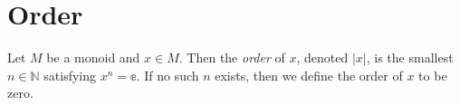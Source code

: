 \section{Order}

\begin{definition}
    \label{definition : order}
    \leanok
    Let $M$ be a monoid and $x \in M$. Then the \textit{order} of $x$, denoted $|x|$, is the smallest $n \in \mathbb{N}$ satisfying $x^n = \mathbb{e}$. If no such $n$ exists, then we define the order of $x$ to be zero.
\end{definition}
